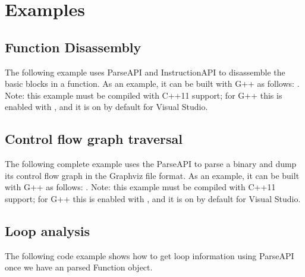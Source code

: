 \section{Examples}
\label{sec:example}

\subsection{Function Disassembly}

The following example uses ParseAPI and InstructionAPI to disassemble
the basic blocks in a function. As an example, it can be built with
G++ as follows: . Note: this example must be compiled with C++11 support; for
G++ this is enabled with , and it is on by default
for Visual Studio.



\subsection{Control flow graph traversal}

The following complete example uses the ParseAPI to parse a binary and
dump its control flow graph in the Graphviz file format. As an
example, it can be built with G++ as follows: . Note: this example must be
compiled with C++11 support; for G++ this is enabled with
, and it is on by default for Visual Studio.



\subsection{Loop analysis}

The following code example shows how to get loop information using ParseAPI once we have an parsed Function object.



